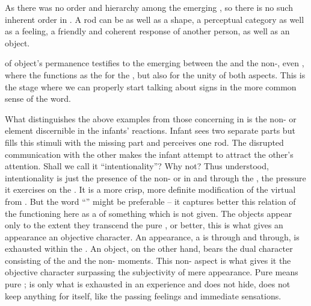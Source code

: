 \pa As there was no order and hierarchy among the emerging , so
there is no such inherent order in . A rod can be
 as well as a shape, a perceptual category as well as a feeling,
a friendly and coherent response of another person, as well as an object.

 of object's permanence testifies to the emerging
 between the  and the non-, even
, where the 
 functions as the  for the , but also for the
unity of both aspects. This is the stage where we can properly start talking
about signs in the more common sense of the word.


\pa\label{pa:intentional} What distinguishes the above examples
from those concerning  in
 is the non- or  element
discernible in the infants' 
reactions.  Infant sees two separate parts but fills this  stimuli
with the missing part and perceives one rod.  The disrupted communication with
the other makes the infant attempt to attract the other's attention.  Shall we
call it ``intentionality''?  Why not?  Thus understood, intentionality is just
the presence of the non- or  in and through the
, the pressure it exercises on 
the .  It is a more crisp, more definite modification of the virtual
 from .  But the word ``'' might be
preferable -- it captures better this relation of the  functioning
here as a  of something which is not  given.  The objects
appear only to the extent they transcend the pure \hoa, or better, this is what
gives an appearance an objective character.  An appearance, a  is
 through and through, is exhausted within the \hoa.  An object, on
the other hand, bears the dual character consisting of the  and the
non- moments.  This non- aspect is what gives it the
objective character surpassing the subjectivity of mere appearance.  Pure
 means pure ;  is only what is
exhausted in an  experience and does not hide, does not keep anything
for itself, like the passing feelings and immediate sensations.

